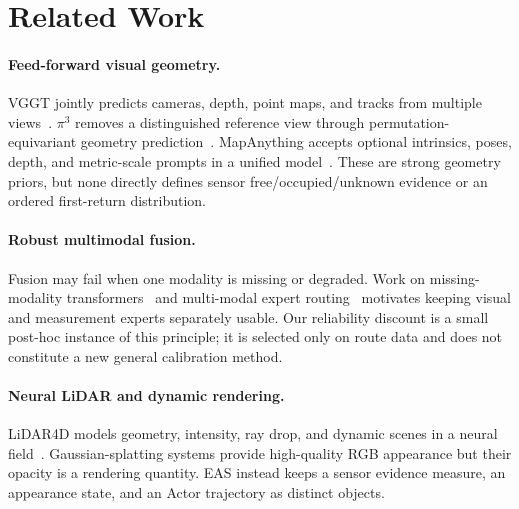 \section{Related Work}
\paragraph{Feed-forward visual geometry.}
VGGT jointly predicts cameras, depth, point maps, and tracks from multiple
views~\cite{wang2025vggt}. $\pi^3$ removes a distinguished reference view through
permutation-equivariant geometry prediction~\cite{wang2025pi3}. MapAnything accepts
optional intrinsics, poses, depth, and metric-scale prompts in a unified
model~\cite{keetha2025mapanything}. These are strong geometry priors, but none directly
defines sensor free/occupied/unknown evidence or an ordered first-return distribution.

\paragraph{Robust multimodal fusion.}
Fusion may fail when one modality is missing or degraded. Work on missing-modality
transformers~\cite{ma2022missing} and multi-modal expert routing~\cite{park2025mome}
motivates keeping visual and measurement experts separately usable. Our reliability
discount is a small post-hoc instance of this principle; it is selected only on route
data and does not constitute a new general calibration method.

\paragraph{Neural LiDAR and dynamic rendering.}
LiDAR4D models geometry, intensity, ray drop, and dynamic scenes in a neural
field~\cite{zheng2024lidar4d}. Gaussian-splatting systems provide high-quality RGB
appearance but their opacity is a rendering quantity. EAS instead keeps a sensor
evidence measure, an appearance state, and an Actor trajectory as distinct objects.
